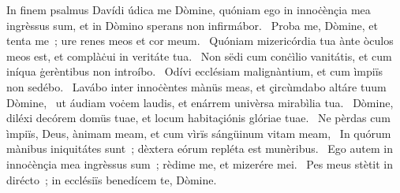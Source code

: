 { In finem psalmus Davídi}
{%
údica me Dòmine, quóniam ego in innoċènçia mea ingrèssus sum, et in Dòmino sperans non infirmábor. 
~Proba me, Dòmine, et tenta me~; ure renes meos et cor meum. 
~Quóniam mizericórdia tua ànte òculos meos est, et complàċui in veritáte tua. 
~Non sëdi cum conċìlio vanitátis, et cum iníqua ġerèntibus non introíbo. 
~Odívi ecclésiam malignàntium, et cum ìmpiïs non sedébo. 
~Lavábo inter innoċèntes mànüs meas, et çircùmdabo altáre tuum Dòmine, 
~ut áudiam voċem laudis, et enárrem univèrsa mirabìlia tua. 
~Dòmine, diléxi decórem domüs tuae, et locum habitaçiónis glóriae tuae. 
~Ne pèrdas cum ìmpiïs, Deus, ànimam meam, et cum vìrïs sángüinum vitam meam, 
~In quórum mànibus iniquitátes sunt~; dèxtera eórum repléta est munèribus. 
~Ego autem in innoċènçia mea ingrèssus sum~; rèdime me, et mizerére mei. 
~Pes meus stètit in dirécto~; in ecclésiïs benedícem te, Dòmine. 
}
